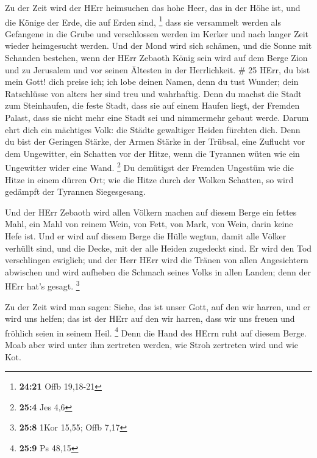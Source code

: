  Zu der Zeit wird der HErr heimsuchen das hohe Heer, das in
der Höhe ist, und die Könige der Erde, die auf Erden sind, \footnote{\textbf{24:21}
  Offb 19,18-21}  dass sie versammelt werden als Gefangene
in die Grube und verschlossen werden im Kerker und nach langer Zeit
wieder heimgesucht werden.  Und der Mond wird sich schämen,
und die Sonne mit Schanden bestehen, wenn der HErr Zebaoth König sein
wird auf dem Berge Zion und zu Jerusalem und vor seinen Ältesten in der
Herrlichkeit. \# 25  HErr, du bist mein Gott! dich preise
ich; ich lobe deinen Namen, denn du tust Wunder; dein Ratschlüsse von
alters her sind treu und wahrhaftig.  Denn du machst die
Stadt zum Steinhaufen, die feste Stadt, dass sie auf einem Haufen liegt,
der Fremden Palast, dass sie nicht mehr eine Stadt sei und nimmermehr
gebaut werde.  Darum ehrt dich ein mächtiges Volk: die
Städte gewaltiger Heiden fürchten dich.  Denn du bist der
Geringen Stärke, der Armen Stärke in der Trübsal, eine Zuflucht vor dem
Ungewitter, ein Schatten vor der Hitze, wenn die Tyrannen wüten wie ein
Ungewitter wider eine Wand. \footnote{\textbf{25:4} Jes 4,6}
 Du demütigst der Fremden Ungestüm wie die Hitze in einem
dürren Ort; wie die Hitze durch der Wolken Schatten, so wird gedämpft
der Tyrannen Siegesgesang.

 Und der HErr Zebaoth wird allen Völkern machen auf diesem
Berge ein fettes Mahl, ein Mahl von reinem Wein, von Fett, von Mark, von
Wein, darin keine Hefe ist.  Und er wird auf diesem Berge
die Hülle wegtun, damit alle Völker verhüllt sind, und die Decke, mit
der alle Heiden zugedeckt sind.  Er wird den Tod
verschlingen ewiglich; und der Herr HErr wird die Tränen von allen
Angesichtern abwischen und wird aufheben die Schmach seines Volks in
allen Landen; denn der HErr hat's gesagt. \footnote{\textbf{25:8} 1Kor
  15,55; Offb 7,17}

 Zu der Zeit wird man sagen: Siehe, das ist unser Gott, auf
den wir harren, und er wird uns helfen; das ist der HErr auf den wir
harren, dass wir uns freuen und fröhlich seien in seinem Heil.
\footnote{\textbf{25:9} Ps 48,15}  Denn die Hand des HErrn
ruht auf diesem Berge. Moab aber wird unter ihm zertreten werden, wie
Stroh zertreten wird und wie Kot.

